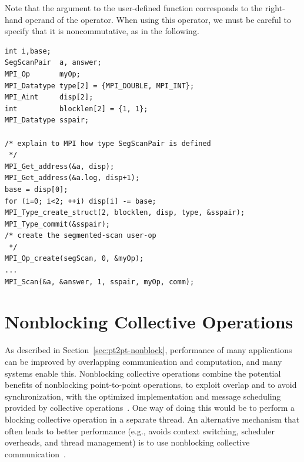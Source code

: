 \begin{example}
Note that the  argument to the user-defined function
corresponds to the right-hand operand of the operator.  When using
this operator, we must be careful to specify that it is noncommutative, as in the following.
\begin{lstlisting}[language={[MPI]C}]
int i,base;
SegScanPair  a, answer;
MPI_Op       myOp;
MPI_Datatype type[2] = {MPI_DOUBLE, MPI_INT};
MPI_Aint     disp[2];
int          blocklen[2] = {1, 1};
MPI_Datatype sspair;

/* explain to MPI how type SegScanPair is defined
 */
MPI_Get_address(&a, disp);
MPI_Get_address(&a.log, disp+1);
base = disp[0];
for (i=0; i<2; ++i) disp[i] -= base;
MPI_Type_create_struct(2, blocklen, disp, type, &sspair);
MPI_Type_commit(&sspair);
/* create the segmented-scan user-op
 */
MPI_Op_create(segScan, 0, &myOp);
...
MPI_Scan(&a, &answer, 1, sspair, myOp, comm);
\end{lstlisting}

\end{example}


\section{Nonblocking Collective Operations}
\label{sec:nbcoll}
As described in Section~\ref{sec:pt2pt-nonblock}, performance of many
applications can be improved by overlapping communication and
computation, and many systems enable this. Nonblocking
collective operations combine the potential benefits of nonblocking
point-to-point operations, to exploit overlap and to avoid
synchronization, with the optimized implementation and message
scheduling provided by collective
operations~\cite{hoefler-app-parco,hoefler-europvm08-osem}.  One way of
doing this would be to perform a blocking collective operation in a
separate thread. An alternative mechanism that often leads to better
performance (e.g., avoids context switching, scheduler overheads, and
thread management) is to use nonblocking collective
communication~\cite{hoefler-ib-threads}.


